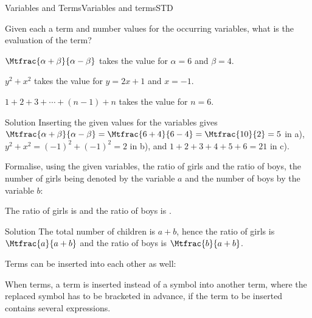 \begin{MXContent}{Variables and Terms}{Variables and terms}{STD}
\begin{MExercise}
Given each a term and number values for the occurring variables, what is the evaluation of the term?
\begin{MExerciseItems}
\item{$\Mtfrac{\alpha+\beta}{\alpha-\beta}$ takes the value  for $\alpha=6$ and $\beta=4$.}
\item{$y^2+x^2$ takes the value  for $y=2x+1$ and $x=-1$.}
\item{$1+2+3+\cdots+(n-1)+n$ takes the value  for $n=6$.}
\end{MExerciseItems}
\begin{MHint}{Solution}
Inserting the given values for the variables gives $\Mtfrac{\alpha+\beta}{\alpha-\beta}=\Mtfrac{6+4}{6-4}=\Mtfrac{10}{2}=5$ in a),
$y^2+x^2=(-1)^2+(-1)^2=2$ in b), and $1+2+3+4+5+6=21$ in c).
\end{MHint}
\end{MExercise}

\begin{MExercise}
Formalise, using the given variables, the ratio of girls and the ratio of boys, 
the number of girls being denoted by the variable $a$ and the number of boys by the variable $b$:


The ratio of girls is  and
the ratio of boys is .\\

\begin{MHint}{Solution}
The total number of children is $a+b$, hence the ratio of girls is $\Mtfrac{a}{a+b}$
and the ratio of boys is $\Mtfrac{b}{a+b}$.
\end{MHint}
\end{MExercise}


Terms can be inserted into each other as well:

\begin{MInfo}
When  terms, a term is inserted instead of a symbol into another term, where the 
replaced symbol has to be bracketed in advance, if the term to be inserted contains several expressions.
\end{MInfo}


\end{MXContent}

